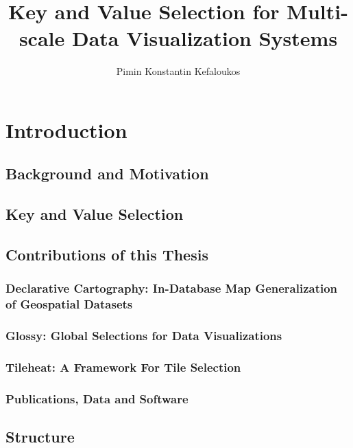 \documentclass[11pt, oneside]{report}   	%
\title{Key and Value Selection for Multi-scale Data Visualization Systems}
\author{Pimin Konstantin Kefaloukos}
\begin{document}
\maketitle

\tableofcontents


\chapter{Introduction}
\section{Background and Motivation}
\section{Key and Value Selection}
\section{Contributions of this Thesis}
\subsection{Declarative Cartography: In-Database Map Generalization of Geospatial Datasets}
\subsection{Glossy: Global Selections for Data Visualizations}
\subsection{Tileheat: A Framework For Tile Selection}
\subsection{Publications, Data and Software}
\section{Structure}
\end{document}

